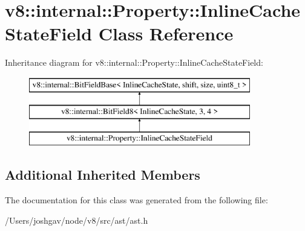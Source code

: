 \hypertarget{classv8_1_1internal_1_1_property_1_1_inline_cache_state_field}{}\section{v8\+:\+:internal\+:\+:Property\+:\+:Inline\+Cache\+State\+Field Class Reference}
\label{classv8_1_1internal_1_1_property_1_1_inline_cache_state_field}
Inheritance diagram for v8\+:\+:internal\+:\+:Property\+:\+:Inline\+Cache\+State\+Field\+:\begin{figure}[H]
\begin{center}
\leavevmode
\includegraphics[height=3.000000cm]{classv8_1_1internal_1_1_property_1_1_inline_cache_state_field}
\end{center}
\end{figure}
\subsection*{Additional Inherited Members}


The documentation for this class was generated from the following file\+:\begin{DoxyCompactItemize}
\item 
/\+Users/joshgav/node/v8/src/ast/ast.\+h\end{DoxyCompactItemize}
